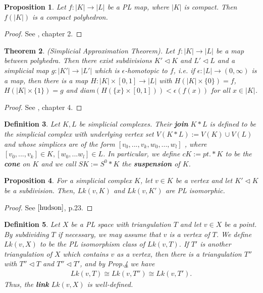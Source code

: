 \documentclass{scrreprt}
\newtheorem{prop}{Proposition}[chapter]
\newtheorem{theorem}[prop]{Theorem}
\newtheorem{definition}[prop]{Definition}
\begin{document}
\begin{prop}\label{imageplmappolyhedron}
Let $f: |K| \to |L|$ be a PL map, where $|K|$ is compact. Then $f(|K|)$ is a compact polyhedron.
\end{prop}

\begin{proof}
See \cite{pltopo}, chapter 2.
\end{proof}

\begin{theorem}(Simplicial Approximation Theorem).
Let $f: |K| \to |L|$ be a map between polyhedra. Then there exist subdivisions $K' \lhd K$ and $L' \lhd L$ and a simplicial map $g: |K'| \to |L'|$ which is $\epsilon$-homotopic to $f$, i.e. if $\epsilon: |L| \to (0,\infty)$ is a map, then there is a map $H: |K| \times [0,1] \to |L|$ with $H(|K| \times \{ 0\})=f$, $H(|K| \times \{ 1\})=g$ and diam$(H(\{ x \} \times [0,1])) < \epsilon(f(x))$ for all $x \in |K|$.
\end{theorem}

\begin{proof}
See \cite{lecturenotes}, chapter 4.
\end{proof}

\begin{definition}
Let $K,L$ be simplicial complexes. Their \textbf{join} $K*L$ is defined to be the simplicial complex with underlying vertex set $V(K*L):=V(K) \cup V(L)$ and whose simplices are of the form $[v_0,...,v_k,w_0,...,w_l]$ , where $[v_0,...,v_k] \in K, [w_0,...w_l] \in L$. In particular, we define $cK := pt. * K$ to be the \textbf{cone} on $K$ and we call $SK:=S^0 * K$ the \textbf{suspension} of $K$.
\end{definition}

\begin{prop}\label{subdivisionlink}
For a simplicial complex $K$, let $v \in K$ be a vertex and let $K' \lhd K$ be a subdivision. Then, $Lk(v,K)$ and $Lk(v,K')$ are PL isomorphic.
\end{prop}

\begin{proof}
See $\cite{hudson}$, p.23.
\end{proof}

\begin{definition}
Let $X$ be a PL space with triangulation $T$ and let $v \in X$ be a point. By subdividing $T$ if necessary, we may assume that $v$ is a vertex of $T$. We define $Lk(v,X)$ to be the PL isomorphism class of $Lk(v,T)$. If $T'$ is another triangulation of $X$ which contains $v$ as a vertex, then there is a triangulation $T''$ with $T'' \lhd T$ and $T'' \lhd T'$, and by Prop.\ref{subdivisionlink} we have
\begin{align*}
Lk(v,T) \cong Lk(v,T'') \cong Lk(v,T').
\end{align*}
Thus, the \textbf{link} $Lk(v,X)$ is well-defined.
\end{definition}
\end{document}
